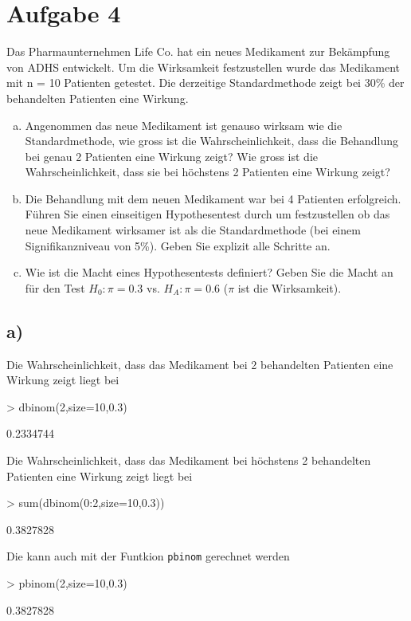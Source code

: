 \section{Aufgabe 4}
Das Pharmaunternehmen Life Co. hat ein neues Medikament zur Bekämpfung
von ADHS entwickelt. Um die Wirksamkeit festzustellen wurde das Medikament 
mit n = 10 Patienten getestet. Die derzeitige Standardmethode zeigt bei 30\% 
der behandelten Patienten eine Wirkung.

\begin{enumerate}[(a)]
    \item Angenommen das neue Medikament ist genauso wirksam wie die 
          Standardmethode, wie gross ist die Wahrscheinlichkeit, dass die 
          Behandlung bei genau 2 Patienten eine Wirkung zeigt? Wie gross 
          ist die Wahrscheinlichkeit, dass sie bei höchstens 2 Patienten 
          eine Wirkung zeigt?
    \item Die Behandlung mit dem neuen Medikament war bei 4 Patienten 
          erfolgreich. Führen Sie einen einseitigen Hypothesentest durch um 
          festzustellen ob das neue Medikament wirksamer ist als die 
          Standardmethode (bei einem Signifikanzniveau von 5\%). 
          Geben Sie explizit alle Schritte an.
    \item Wie ist die Macht eines Hypothesentests definiert? 
          Geben Sie die Macht an für den Test $H_0: \pi = 0.3$ vs. 
          $H_A:\pi=0.6$ ($\pi$ ist die Wirksamkeit).
\end{enumerate}

\subsection*{a)}
Die Wahrscheinlichkeit, dass das Medikament bei 2 behandelten Patienten
eine Wirkung zeigt liegt bei
\begin{Schunk}
\begin{Sinput}
> dbinom(2,size=10,0.3)
\end{Sinput}
\begin{Soutput}
[1] 0.2334744
\end{Soutput}
\end{Schunk}
Die Wahrscheinlichkeit, dass das Medikament bei höchstens 2 behandelten 
Patienten eine Wirkung zeigt liegt bei
\begin{Schunk}
\begin{Sinput}
> sum(dbinom(0:2,size=10,0.3))
\end{Sinput}
\begin{Soutput}
[1] 0.3827828
\end{Soutput}
\end{Schunk}
Die kann auch mit der Funtkion \verb!pbinom! gerechnet werden
\begin{Schunk}
\begin{Sinput}
> pbinom(2,size=10,0.3)
\end{Sinput}
\begin{Soutput}
[1] 0.3827828
\end{Soutput}
\end{Schunk}

